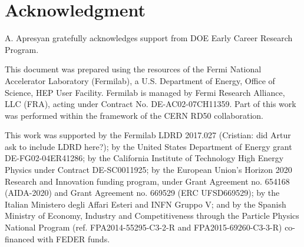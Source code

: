 \documentclass[preprint,1p]{elsarticle}
\begin{document}
\section*{Acknowledgment}


A. Apresyan gratefully acknowledges support from DOE Early Career Research Program.

This document was prepared using the resources of the Fermi National Accelerator
Laboratory (Fermilab), a U.S. Department of Energy, Office of Science, HEP User
Facility. Fermilab is managed by Fermi Research Alliance, LLC (FRA), acting
under Contract No. DE-AC02-07CH11359. Part of this work was performed within the
framework of the CERN RD50 collaboration.

This work was supported by the Fermilab LDRD 2017.027 {\color{red} (Cristian: did Artur ask to include LDRD here?)}; by the United States
Department of Energy grant DE-FG02-04ER41286; by the California Institute of
Technology High Energy Physics under Contract DE-SC0011925; by the European
Union's Horizon 2020 Research and Innovation funding program, under Grant
Agreement no. 654168 (AIDA-2020) and Grant Agreement no. 669529 (ERC
UFSD669529); by the Italian Ministero degli Affari Esteri and INFN Gruppo V; and
by the Spanish Ministry of Economy, Industry and Competitiveness through the
Particle Physics National Program (ref. FPA2014-55295-C3-2-R and
FPA2015-69260-C3-3-R) co-financed with FEDER funds.






\end{document}
